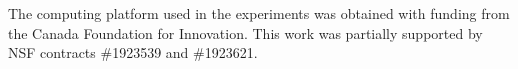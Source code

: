 \begin{acknowledgments}
The computing platform used in the experiments was obtained with funding
from the Canada Foundation for Innovation. This work was partially supported
by NSF contracts \#1923539 and \#1923621.
\end{acknowledgments}
